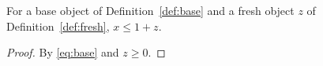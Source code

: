 
\begin{theorem}\label{thm:cond}
For a base object of Definition~\ref{def:base} and a fresh object $z$ of
Definition~\ref{def:fresh}, $x \le 1 + z$.
\end{theorem}

\begin{proof}
By \eqref{eq:base} and $z \ge 0$.
\end{proof}

